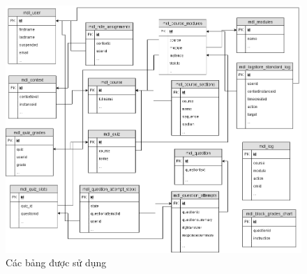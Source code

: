 \begin{center}
	\begin{figure}[htp]
		\begin{center}
			\includegraphics[scale=0.5]{img/database}
		\end{center}
		\caption{Các bảng được sử dụng}
		\label{refhinh19}
	\end{figure}
\end{center}

